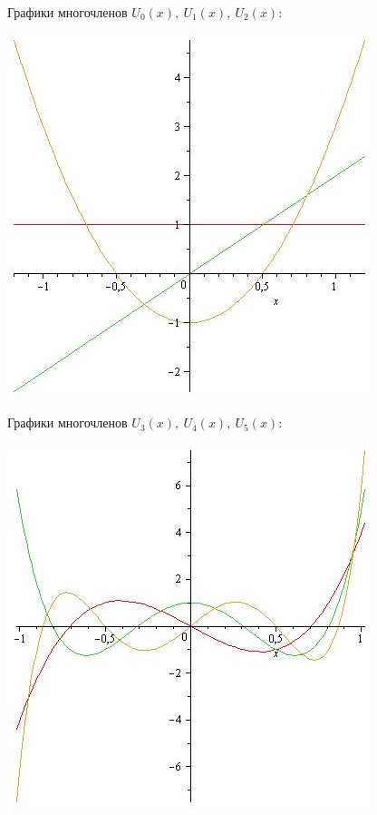 \documentclass[12pt]{article}
\theoremstyle{definition}
\numberwithin{equation}{section}
\begin{document}
	Графики многочленов $U_0(x),~ U_1(x),~ U_2(x)$:\begin{center}
		\includegraphics[scale=0.5]{U0U1U2.jpg} \end{center}
	Графики многочленов $U_3(x),~ U_4(x),~ U_5(x)$:\begin{center}
		\includegraphics[scale=0.5]{U3U4U5.jpg} \end{center}	
\end{document}
